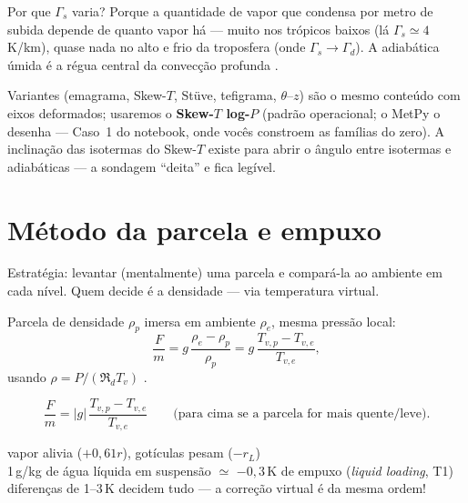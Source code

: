 \documentclass[11pt]{article}
\begin{document}
Por que $\Gamma_s$ varia? Porque a quantidade de vapor que condensa por
metro de subida depende de quanto vapor há — muito nos trópicos baixos
(lá $\Gamma_s\simeq4$\,K/km), quase nada no alto e frio da troposfera
(onde $\Gamma_s \to \Gamma_d$). A adiabática úmida é a régua central da
convecção profunda .

Variantes (emagrama, Skew-$T$, Stüve, tefigrama, $\theta$--$z$) são o
mesmo conteúdo com eixos deformados; usaremos o \textbf{Skew-$T$
log-$P$} (padrão operacional; o MetPy o desenha — Caso~1 do notebook,
onde vocês constroem as famílias do zero). A inclinação das isotermas do
Skew-$T$ existe para abrir o ângulo entre isotermas e adiabáticas — a
sondagem ``deita'' e fica legível.


\section{Método da parcela e empuxo}\label{sec:parcela}

Estratégia: levantar (mentalmente) uma parcela e compará-la ao ambiente
em cada nível. Quem decide é a densidade — via temperatura virtual.

\begin{formadif}
Parcela de densidade $\rho_p$ imersa em ambiente $\rho_e$, mesma pressão
local:
\[ \frac{F}{m} = g\,\frac{\rho_e - \rho_p}{\rho_p}
 = g\,\frac{T_{v,p} - T_{v,e}}{T_{v,e}}, \]
usando $\rho = P/(\Re_d T_v)$ .
\end{formadif}

\begin{formalivro}[Stull eq.~5.2]
\[ \frac{F}{m} = |g|\,\frac{T_{v,p} - T_{v,e}}{T_{v,e}}
\qquad\text{(para cima se a parcela for mais quente/leve).} \]
\end{formalivro}

\begin{noquadro}
vapor alivia ($+0{,}61r$), gotículas pesam ($-r_L$)
\\
1\,g/kg de água líquida em suspensão $\simeq$ $-0{,}3$\,K de empuxo
(\emph{liquid loading}, T1)\\
diferenças de 1--3\,K decidem tudo — a correção virtual é da mesma ordem!
\end{noquadro}
\end{document}
